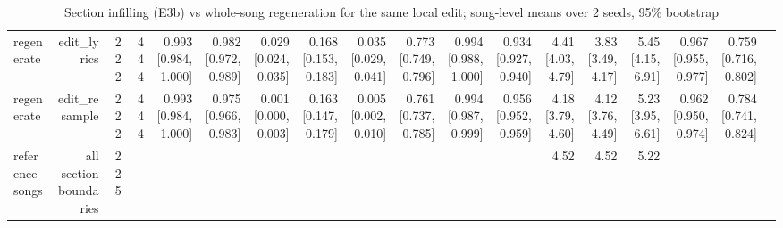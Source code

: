 \begin{table}[t]
\begin{tabular}{lrrrrrrrrrrrrrrrrr}
regenerate & edit\_lyrics & 222 & 444 & 0.993 [0.984, 1.000] & 0.982 [0.972, 0.989] & 0.029 [0.024, 0.035] & 0.168 [0.153, 0.183] & 0.035 [0.029, 0.041] & 0.773 [0.749, 0.796] & 0.994 [0.988, 1.000] & 0.934 [0.927, 0.940] & 4.41 [4.03, 4.79] & 3.83 [3.49, 4.17] & 5.45 [4.15, 6.91] & 0.967 [0.955, 0.977] & 0.759 [0.716, 0.802] &  \\
regenerate & edit\_resample & 222 & 444 & 0.993 [0.984, 1.000] & 0.975 [0.966, 0.983] & 0.001 [0.000, 0.003] & 0.163 [0.147, 0.179] & 0.005 [0.002, 0.010] & 0.761 [0.737, 0.785] & 0.994 [0.987, 0.999] & 0.956 [0.952, 0.959] & 4.18 [3.79, 4.60] & 4.12 [3.76, 4.49] & 5.23 [3.95, 6.61] & 0.962 [0.950, 0.974] & 0.784 [0.741, 0.824] &  \\
reference songs & all section boundaries & 225 &  &  &  &  &  &  &  &  &  & 4.52 & 4.52 & 5.22 &  &  &  \\
\bottomrule
\end{tabular}
\caption{Section infilling (E3b) vs whole-song regeneration for the same local edit; song-level means over 2 seeds, 95\% bootstrap}
\label{tab:infill}
\end{table}
